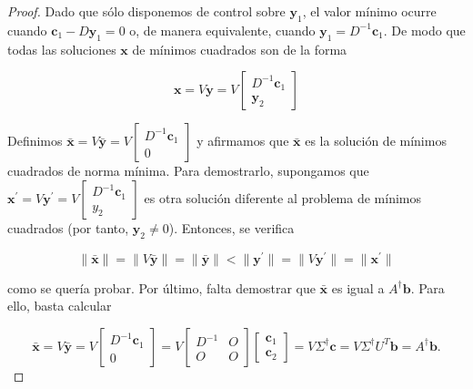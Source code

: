 \begin{proof}
    Dado que sólo disponemos de control sobre $\mathbf{y}_1$, el valor mínimo ocurre cuando $\mathbf{c}_1 - D \mathbf{y}_1 = 0$ o, de manera equivalente, cuando $\mathbf{y}_1 = D^{-1} \mathbf{c}_1$. De modo que todas las soluciones $\mathbf{x}$ de mínimos cuadrados son de la forma  

    \[
        \mathbf{x} = V \mathbf{y} = V \begin{bmatrix} D^{-1} \mathbf{c}_1 \\ \mathbf{y}_2 \end{bmatrix}
    \]

    Definimos $\bar{\mathbf{x}} = V \bar{\mathbf{y}} = V \begin{bmatrix} D^{-1} \mathbf{c}_1 \\ 0 \end{bmatrix}$ y afirmamos que $\bar{\mathbf{x}}$ es la solución de mínimos cuadrados de norma mínima. Para demostrarlo, supongamos que $\mathbf{x}^{\prime}=V\mathbf{y}^{\prime} = V \begin{bmatrix} D^{-1} \mathbf{c}_1 \\ y_2 \end{bmatrix}$ es otra solución diferente al problema de mínimos cuadrados (por tanto, $\mathbf{y}_2 \neq 0$). Entonces, se verifica

    \[ \| \bar{\mathbf{x}} \| = \| V\bar{\mathbf{y}} \| = \| \bar{\mathbf{y}} \| < \| {\mathbf{y}^{\prime}} \| = \| V\mathbf{y}^{\prime} \| = \| \mathbf{x}^{\prime} \|\]

    como se quería probar. Por último, falta demostrar que $\bar{\mathbf{x}}$ es igual a $A^{\dagger}\mathbf{b}$. Para ello, basta calcular

    \[ \bar{\mathbf{x}} = V\bar{\mathbf{y}} = V \begin{bmatrix} D^{-1} \mathbf{c}_1 \\ 0 \end{bmatrix} = V \begin{bmatrix} D^{-1} & O \\ O & O \end{bmatrix} \begin{bmatrix} \mathbf{c}_1 \\ \mathbf{c}_2 \end{bmatrix} = V \Sigma^{\dagger} \mathbf{c} = V \Sigma^{\dagger} U^{T} \mathbf{b} = A^{\dagger}\mathbf{b}.\]

    
\end{proof}


\endinput